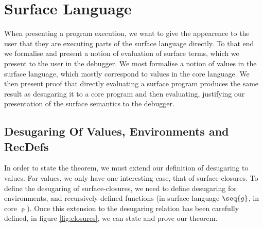 \section{Surface Language}
\label{sec:surfacesemantics}
When presenting a program execution, we want to give the appearence to the user that they are executing parts
of the surface language directly. To that end we formalise and present a notion of evaluation of surface
terms, which we present to the user in the debugger. We most formalise a notion of values in the surface
language, which mostly correspond to values in the core language. We then present proof that directly
evaluating a surface program produces the same result as desugaring it to a core program and then evaluating, justifying our presentation of the surface semantics to the debugger.

\subsection{Desugaring Of Values, Environments and RecDefs}
In order to state the theorem, we must extend our definition of desugaring to values. For values, we only have
one interesting case, that of surface closures. To define the desugaring of surface-closures, we need to define
desugaring for environments, and recursively-defined functions (in surface language $\seq{g}$, in core $\uprho$).
Once this extension to the desugaring relation has been carefully defined, in figure \ref{fig:closures}, we can state and prove our theorem.

